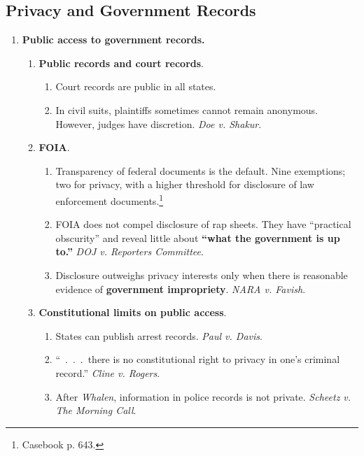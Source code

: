 \newpage

\subsection{Privacy and Government Records}

\begin{enumerate}
    \item \textbf{Public access to government records.}
    \begin{enumerate}
        \item \textbf{Public records and court records}.
        \begin{enumerate}
            \item Court records are public in all states.
            \item In civil suits, plaintiffs sometimes cannot remain 
            anonymous. However, judges have discretion. \emph{Doe v. Shakur}.
        \end{enumerate}
        \item \textbf{FOIA}.
        \begin{enumerate}
            \item Transparency of federal documents is the default. Nine 
            exemptions; two for privacy, with a higher threshold for 
            disclosure of law enforcement documents.\footnote{Casebook p. 
            643.}
            \item FOIA does not compel disclosure of rap sheets. They have 
            ``practical obscurity'' and reveal little about \textbf{``what the 
            government is up to.''} \emph{DOJ v. Reporters Committee}.
            \item Disclosure outweighs privacy interests only when there is 
            reasonable evidence of \textbf{government impropriety}. \emph{NARA 
            v.  Favish}.
        \end{enumerate}
        \item \textbf{Constitutional limits on public access}.
        \begin{enumerate}
            \item States can publish arrest records. \emph{Paul v. Davis}.
            \item ``~.~.~.~there is no constitutional right to privacy in 
            one's criminal record.'' \emph{Cline v. Rogers}.
            \item After \emph{Whalen}, information in police records is not 
            private. \emph{Scheetz v. The Morning Call}.

\end{enumerate}
\end{enumerate}
\end{enumerate}
